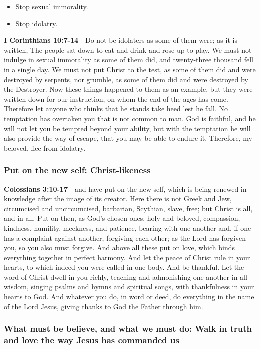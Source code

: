 \documentclass[11pt]{article}
\begin{document}
\begin{itemize}
\item Stop sexual immorality.
\item Stop idolatry.
\end{itemize}

\textbf{I Corinthians 10:7-14} - Do not be idolaters as some of them were; as it is written, The people sat down to eat and drink and rose up to play. We must not indulge in sexual immorality as some of them did, and twenty-three thousand fell in a single day. We must not put Christ to the test, as some of them did and were destroyed by serpents, nor grumble, as some of them did and were destroyed by the Destroyer. Now these things happened to them as an example, but they were written down for our instruction, on whom the end of the ages has come. Therefore let anyone who thinks that he stands take heed lest he fall. No temptation has overtaken you that is not common to man. God is faithful, and he will not let you be tempted beyond your ability, but with the temptation he will also provide the way of escape, that you may be able to endure it. Therefore, my beloved, flee from idolatry.

\subsubsection{Put on the new self: Christ-likeness}
\label{sec:org8ba1aed}
\textbf{Colossians 3:10-17} - and have put on the new self, which is being renewed in knowledge after the image of its creator. Here there is not Greek and Jew, circumcised and uncircumcised, barbarian, Scythian, slave, free; but Christ is all, and in all. Put on then, as God's chosen ones, holy and beloved, compassion, kindness, humility, meekness, and patience, bearing with one another and, if one has a complaint against another, forgiving each other; as the Lord has forgiven you, so you also must forgive. And above all these put on love, which binds everything together in perfect harmony. And let the peace of Christ rule in your hearts, to which indeed you were called in one body. And be thankful. Let the word of Christ dwell in you richly, teaching and admonishing one another in all wisdom, singing psalms and hymns and spiritual songs, with thankfulness in your hearts to God. And whatever you do, in word or deed, do everything in the name of the Lord Jesus, giving thanks to God the Father through him.

\subsubsection{What must be believe, and what we must do: Walk in \textbf{truth} and \textbf{love} the way Jesus has commanded us}
\label{sec:org785acc8}
\end{document}
